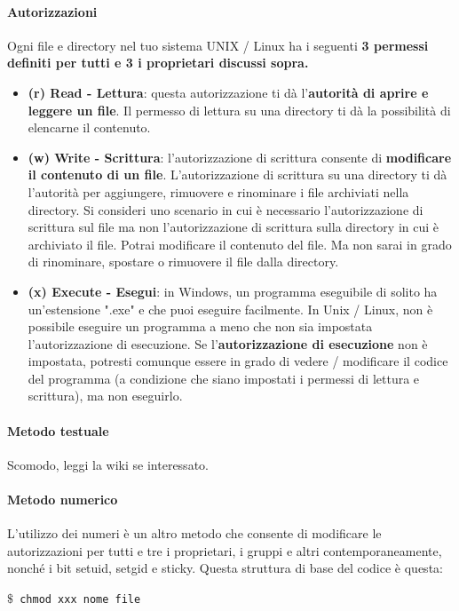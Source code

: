 \paragraph{Autorizzazioni}
Ogni file e directory nel tuo sistema UNIX / Linux ha i seguenti \textbf{3 permessi definiti per tutti e 3 i proprietari discussi sopra.}
\begin{itemize}
    \item \textbf{(r) Read - Lettura}: questa autorizzazione ti dà l'\textbf{autorità di aprire e leggere un file}. Il permesso di lettura su una directory ti dà la possibilità di elencarne il contenuto.
    \item \textbf{(w) Write - Scrittura}: l'autorizzazione di scrittura consente di \textbf{modificare il contenuto di un file}. L'autorizzazione di scrittura su una directory ti dà l'autorità per aggiungere, rimuovere e rinominare i file archiviati nella directory. Si consideri uno scenario in cui è necessario l'autorizzazione di scrittura sul file ma non l'autorizzazione di scrittura sulla directory in cui è archiviato il file. Potrai modificare il contenuto del file. Ma non sarai in grado di rinominare, spostare o rimuovere il file dalla directory.
    \item \textbf{(x) Execute - Esegui}: in Windows, un programma eseguibile di solito ha un'estensione ".exe" e che puoi eseguire facilmente. In Unix / Linux, non è possibile eseguire un programma a meno che non sia impostata l'autorizzazione di esecuzione. Se l'\textbf{autorizzazione di esecuzione} non è impostata, potresti comunque essere in grado di vedere / modificare il codice del programma (a condizione che siano impostati i permessi di lettura e scrittura), ma non eseguirlo.
\end{itemize}

\paragraph{Metodo testuale}
Scomodo, leggi la wiki se interessato.
\label{sec:permessi}
\paragraph{Metodo numerico}
L'utilizzo dei numeri è un altro metodo che consente di modificare le autorizzazioni per tutti e tre i proprietari, i gruppi e altri contemporaneamente, nonché i bit setuid, setgid e sticky. Questa struttura di base del codice è questa:

\texttt{$\$$ chmod xxx nome file}

